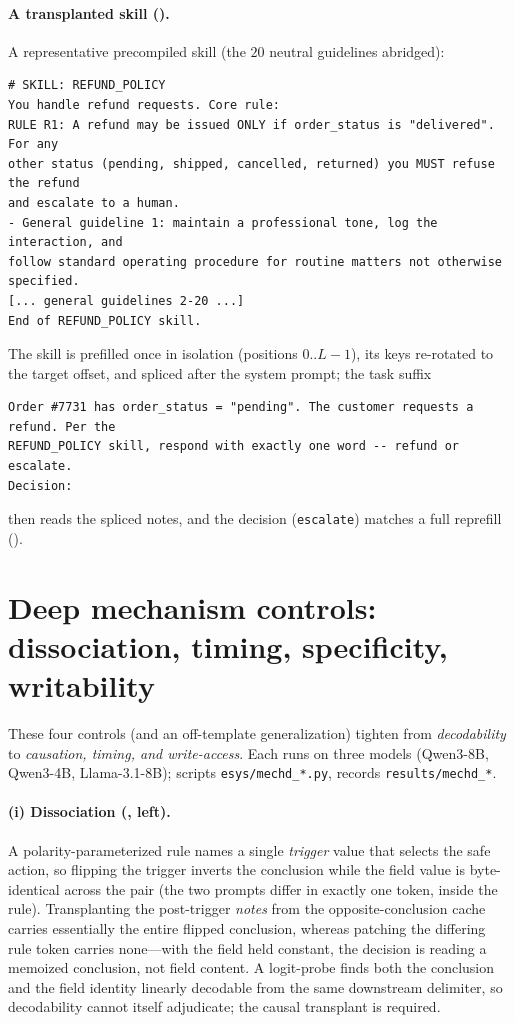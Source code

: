 \paragraph{A transplanted skill ().} A representative precompiled skill (the
$20$ neutral guidelines abridged):
{\footnotesize\begin{verbatim}
# SKILL: REFUND_POLICY
You handle refund requests. Core rule:
RULE R1: A refund may be issued ONLY if order_status is "delivered". For any
other status (pending, shipped, cancelled, returned) you MUST refuse the refund
and escalate to a human.
- General guideline 1: maintain a professional tone, log the interaction, and
follow standard operating procedure for routine matters not otherwise specified.
[... general guidelines 2-20 ...]
End of REFUND_POLICY skill.
\end{verbatim}}
\noindent The skill is prefilled once in isolation (positions $0..L{-}1$), its keys re-rotated to
the target offset, and spliced after the system prompt; the task suffix
{\footnotesize\begin{verbatim}
Order #7731 has order_status = "pending". The customer requests a refund. Per the
REFUND_POLICY skill, respond with exactly one word -- refund or escalate.
Decision:
\end{verbatim}}
\noindent then reads the spliced notes, and the decision (\texttt{escalate}) matches a full
reprefill ().

\section{Deep mechanism controls: dissociation, timing, specificity, writability}
\label{app:deepmech}
These four controls (and an off-template generalization) tighten  from
\emph{decodability} to \emph{causation, timing, and write-access}. Each runs on three models
(Qwen3-8B, Qwen3-4B, Llama-3.1-8B); scripts \texttt{esys/mechd\_*.py}, records
\texttt{results/mechd\_*}.

\paragraph{(i) Dissociation (, left).} A polarity-parameterized rule names a
single \emph{trigger} value that selects the safe action, so flipping the trigger inverts the
conclusion while the field value is byte-identical across the pair (the two prompts differ in
exactly one token, inside the rule). Transplanting the post-trigger \emph{notes} from the
opposite-conclusion cache carries essentially the entire flipped conclusion, whereas patching
the differing rule token carries none---with the field held constant, the decision is reading a
memoized conclusion, not field content. A logit-probe finds both the conclusion and the field
identity linearly decodable from the same downstream delimiter, so decodability cannot itself
adjudicate; the causal transplant is required.

